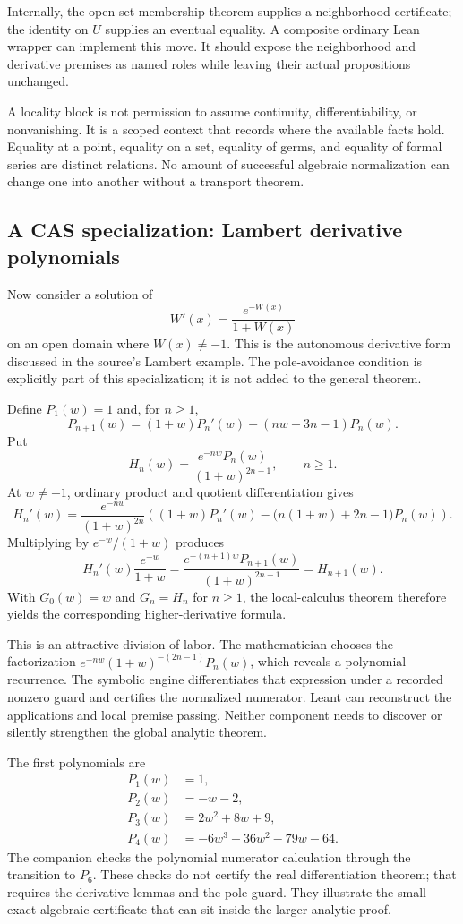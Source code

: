 \documentclass[11pt,letterpaper]{article}
\theoremstyle{definition}
\begin{document}
Internally, the open-set membership theorem supplies a neighborhood certificate;
the identity on \(U\) supplies an eventual equality. A composite ordinary Lean
wrapper can implement this move. It should expose the neighborhood and derivative
premises as named roles while leaving their actual propositions unchanged.

A locality block is not permission to assume continuity, differentiability, or
nonvanishing. It is a scoped context that records where the available facts hold.
Equality at a point, equality on a set, equality of germs, and equality of formal
series are distinct relations. No amount of successful algebraic normalization
can change one into another without a transport theorem.

\subsection{A CAS specialization: Lambert derivative polynomials}
Now consider a solution of
\[
 W'(x)=\frac{e^{-W(x)}}{1+W(x)}
\]
on an open domain where \(W(x)\ne-1\). This is the autonomous derivative form
discussed in the source's Lambert example\cite{pode}. The pole-avoidance condition
is explicitly part of this specialization; it is not added to the general theorem.

Define \(P_1(w)=1\) and, for \(n\ge1\),
\begin{equation}\label{eq:lambertpoly}
 P_{n+1}(w)=(1+w)P_n'(w)-(nw+3n-1)P_n(w).
\end{equation}
Put
\[
 H_n(w)=\frac{e^{-nw}P_n(w)}{(1+w)^{2n-1}},\qquad n\ge1.
\]
At \(w\ne-1\), ordinary product and quotient differentiation gives
\[
 H_n'(w)=\frac{e^{-nw}}{(1+w)^{2n}}
 \left((1+w)P_n'(w)-\bigl(n(1+w)+2n-1\bigr)P_n(w)\right).
\]
Multiplying by \(e^{-w}/(1+w)\) produces
\[
 H_n'(w)\frac{e^{-w}}{1+w}
 =\frac{e^{-(n+1)w}P_{n+1}(w)}{(1+w)^{2n+1}}
 =H_{n+1}(w).
\]
With \(G_0(w)=w\) and \(G_n=H_n\) for \(n\ge1\), the local-calculus theorem
therefore yields the corresponding higher-derivative formula.

This is an attractive division of labor. The mathematician chooses the
factorization \(e^{-nw}(1+w)^{-(2n-1)}P_n(w)\), which reveals a polynomial
recurrence. The symbolic engine differentiates that expression under a recorded
nonzero guard and certifies the normalized numerator. Leant can reconstruct the
applications and local premise passing. Neither component needs to discover or
silently strengthen the global analytic theorem.

The first polynomials are
\begin{align*}
 P_1(w)&=1,\\
 P_2(w)&=-w-2,\\
 P_3(w)&=2w^2+8w+9,\\
 P_4(w)&=-6w^3-36w^2-79w-64.
\end{align*}
The companion checks the polynomial numerator calculation through the transition
to \(P_6\). These checks do not certify the real differentiation theorem; that
requires the derivative lemmas and the pole guard. They illustrate the small exact
algebraic certificate that can sit inside the larger analytic proof.
\end{document}

